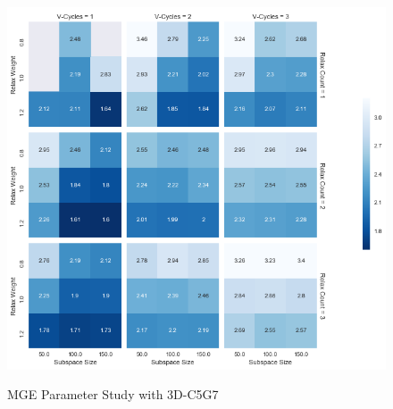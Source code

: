 \documentclass{article}                                                                           %
\begin{document}
\begin{figure}
\caption{MGE Parameter Study with 3D-C5G7}
\includegraphics[width=\textwidth]{./parameter_study.png}
\label{fig:mge-dataframe}
\centering
\end{figure}
\end{document}
